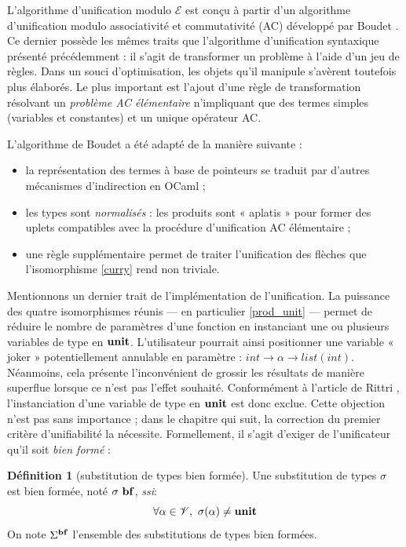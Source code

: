 \documentclass[a4paper]{report}
\theoremstyle{definition}
\newtheorem{definition}[theoreme]{Définition}
\newcommand{\ssi}{\textit{ssi}\xspace}
\newcommand{\unit}{\bold{unit}}
\newcommand{\V}{\mathscr{V}}
\newcommand{\E}{\mathscr{E}}
\begin{document}
L'algorithme d'unification modulo $\E$ est conçu à partir d'un algorithme d'unification modulo associativité et commutativité (AC) développé par Boudet \cite{Boudet}. Ce dernier possède les mêmes traits que l'algorithme d'unification syntaxique présenté précédemment : il s'agit de transformer un problème à l'aide d'un jeu de règles. Dans un souci d'optimisation, les objets qu'il manipule s'avèrent toutefois plus élaborés. Le plus important est l'ajout d'une règle de transformation résolvant un \emph{problème AC élémentaire} n'impliquant que des termes simples (variables et constantes) et un unique opérateur AC.

L'algorithme de Boudet a été adapté de la manière suivante :
\begin{itemize}[nosep]
	\item la représentation des termes à base de pointeurs se traduit par d'autres mécanismes d'indirection en OCaml ;
	\item les types sont \emph{normalisés} : les produits sont « aplatis » pour former des uplets compatibles avec la procédure d'unification AC élémentaire ;
	\item une règle supplémentaire permet de traiter l'unification des flèches que l'isomorphisme \eqref{curry} rend non triviale.
\end{itemize}

Mentionnons un dernier trait de l'implémentation de l'unification. La puissance des quatre isomorphismes réunis — en particulier \eqref{prod_unit} — permet de réduire le nombre de paramètres d'une fonction en instanciant une ou plusieurs variables de type en $\unit$. L'utilisateur pourrait ainsi positionner une variable « joker » potentiellement annulable en paramètre : $int \rightarrow \alpha \rightarrow list (int)$. Néanmoins, cela présente l'inconvénient de grossir les résultats de manière superflue lorsque ce n'est pas l'effet souhaité. Conformément à l'article de Rittri \cite{Rittri93}, l'instanciation d'une variable de type en $\unit$ est donc exclue. Cette objection n'est pas sans importance ; dans le chapitre qui suit, la correction du premier critère d'unifiabilité la nécessite. Formellement, il s'agit d'exiger de l'unificateur qu'il soit \emph{bien formé} :

\begin{definition}[substitution de types bien formée]
	Une substitution de types $\sigma$ est bien formée, noté $\sigma\ \bold{bf}$, \ssi :
	\[ \forall \alpha \in \V,\ \sigma (\alpha) \neq \unit \]
	On note $\Sigma^{\bold{bf}}$ l'ensemble des substitutions de types bien formées.
\end{definition}
\end{document}
